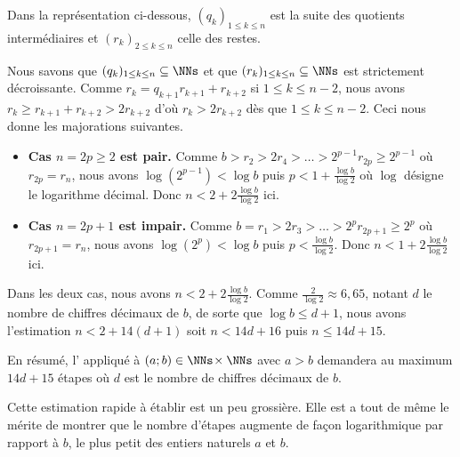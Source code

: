 Dans la représentation ci-dessous, $(q_k)_{1 \leq k \leq n}$ est la suite des quotients intermédiaires et $(r_k)_{2 \leq k \leq n}$ celle des restes.



\medskip


Nous savons que $(q_k)_{1 \leq k \leq n} \subseteq \NNs$ et que $(r_k)_{1 \leq k \leq n} \subseteq \NNs$ est strictement décroissante.
Comme $r_k = q_{k+1} r_{k+1} + r_{k+2}$ si $1 \leq k \leq n-2$, nous avons $r_k \geq r_{k+1} + r_{k+2} > 2 r_{k+2}$ d'où $r_k > 2 r_{k+2}$ dès que $1 \leq k \leq n-2$.
Ceci nous donne les majorations suivantes.

\begin{itemize}[label=\small\textbullet]
	\item \textbf{Cas $n = 2p \geq 2$ est pair.}
	       Comme $b > r_2 > 2 r_4 > \dots > 2^{p-1} r_{2p} \geq 2^{p-1}$ où $r_{2p} = r_n$, nous avons $\log(2^{p-1}) < \log b$ puis $p < 1 + \frac{\log b}{\log 2}$ où $\log$ désigne le logarithme décimal.
	       Donc $n < 2 + 2 \frac{\log b}{\log 2}$ ici.


	\item \textbf{Cas $n = 2p+1$ est impair.}
	       Comme $b = r_1 > 2 r_3 > \dots > 2^p r_{2p+1} \geq 2^p$ où $r_{2p+1} = r_n$, nous avons $\log(2^p) < \log b$ puis $p < \frac{\log b}{\log 2}$.
	       Donc $n < 1 + 2 \frac{\log b}{\log 2}$ ici.
\end{itemize}


Dans les deux cas, nous avons $n < 2 + 2 \frac{\log b}{\log 2}$.
Comme $\frac{2}{\log 2} \approx 6,65$, notant $d$ le nombre de chiffres décimaux de $b$, de sorte que $\log b \leq d + 1$, nous avons l'estimation $n < 2 + 14(d+1)$ soit $n < 14d + 16$ puis $n \leq 14d + 15$.


\medskip


En résumé, l'\algoeucl{} appliqué à $(a ; b) \in \NNs \!\times \NNs$ avec $a > b$ demandera au maximum $14d + 15$ étapes où $d$ est le nombre de chiffres décimaux de $b$.


\begin{remark}
	Cette estimation rapide à établir est un peu grossière. Elle est a tout de même le mérite de montrer que le nombre d'étapes augmente de façon logarithmique par rapport à $b$, le plus petit des entiers naturels $a$ et $b$.
\end{remark}

